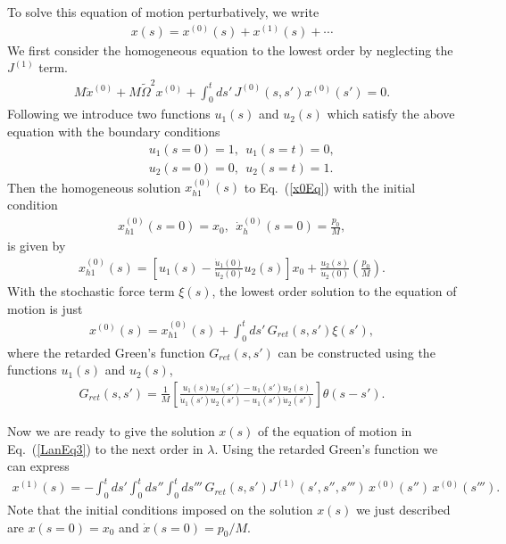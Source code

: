 \documentclass[%
amssymb,preprint,preprintnumbers,nofootinbib,superscriptaddress]{revtex4}
\begin{document}
To solve this equation of motion perturbatively, we write 
\begin{eqnarray}
    x(s)=x^{(0)}(s)+x^{(1)}(s)+\cdots
\end{eqnarray}
We first consider the homogeneous equation to the lowest order by neglecting the $J^{(1)}$ term.
\begin{eqnarray}
M\ddot{x}^{(0)}+M\tilde{\Omega}^{2}x^{(0)}+\int_{0}^{t}ds'\,J^{(0)}(s,s')x^{(0)}(s')=0.\label{x0Eq}
\end{eqnarray}
Following \cite{HPZ92} we introduce two functions $u_{1}(s)$ and $u_{2}(s)$ which satisfy the above equation with the boundary conditions
\begin{eqnarray}
&&u_{1}(s=0)=1,\ \ u_{1}(s=t)=0,\nonumber\\
&&u_{2}(s=0)=0,\ \ u_{2}(s=t)=1.
\end{eqnarray}
Then the homogeneous solution $x^{(0)}_{h1}(s)$ to Eq.~(\ref{x0Eq}) with the initial condition
\begin{eqnarray}
x^{(0)}_{h1}(s=0)=x_{0},\ \ \dot{x}^{(0)}_{h}(s=0)=\frac{p_{0}}{M},
\end{eqnarray}
is given by
\begin{eqnarray}
x^{(0)}_{h1}(s)=\left[u_{1}(s)-\frac{\dot{u}_{1}(0)}{\dot{u}_{2}(0)}u_{2}(s)\right]x_{0}+\frac{u_{2}(s)}{\dot{u}_{2}(0)}\left(\frac{p_{0}}{M}\right).
\end{eqnarray}
With the stochastic force term $\xi(s)$, the lowest order solution to the equation of motion is just
\begin{eqnarray}
x^{(0)}(s)=x_{h1}^{(0)}(s)+\int_{0}^{t}ds' \,G_{ret}(s,s')\xi(s'),
\end{eqnarray}
where the retarded Green's function $G_{ret}(s,s')$ can be constructed using the functions $u_{1}(s)$ and $u_{2}(s)$,
\begin{eqnarray}
G_{ret}(s,s')=\frac{1}{M}\left[\frac{u_{1}(s)u_{2}(s')-u_{1}(s')u_{2}(s)}{\dot{u}_{1}(s')u_{2}(s')-u_{1}(s')\dot{u}_{2}(s')}\right]\theta(s-s').
\end{eqnarray}

Now we are ready to give the solution $x(s)$ of the equation of motion in Eq.~(\ref{LanEq3}) to the next order in $\lambda$. Using the retarded Green's function we can express
\begin{eqnarray}
x^{(1)}(s)=-\int_{0}^{t}ds'\int_{0}^{t}ds''\int_{0}^{t}ds'''\,G_{ret}(s,s')J^{(1)}(s',s'',s''')\,x^{(0)}(s'')\,x^{(0)}(s''').
\end{eqnarray}
Note that the initial conditions imposed on the solution $x(s)$ we just described are
$x(s=0)=x_{0}$ and $\dot{x}(s=0)=p_{0}/M$.
\end{document}
